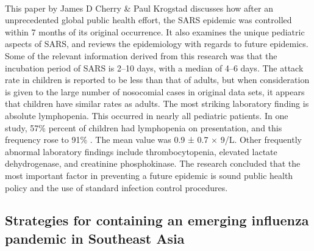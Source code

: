 \documentclass[14pt, a4paper]{extarticle}
\begin{document}
	       \paragraph{} This paper by James D Cherry \& Paul Krogstad discusses how after an unprecedented global public health effort, the SARS epidemic was controlled within 7 months of its original occurrence. It also examines the unique pediatric aspects of SARS, and reviews the epidemiology with regards to future epidemics. Some of the relevant information derived from this research was that the incubation period of SARS is 2–10 days, with a median of 4–6 days. The attack rate in children is reported to be less than that of adults, but when consideration is given to the large number of nosocomial cases in original data sets, it appears that children have similar rates as adults. The most striking laboratory finding is absolute lymphopenia. This occurred in nearly all pediatric patients. In one study, 57\% percent of children had lymphopenia on presentation, and this frequency rose to 91\% . The mean value was 0.9 ± 0.7 × 9/L. Other frequently abnormal laboratory findings include thrombocytopenia, elevated lactate dehydrogenase, and creatinine phosphokinase. The research concluded that the most important factor in preventing a future epidemic is sound public health policy and the use of standard infection control procedures.
	        
	   \subsection{Strategies for containing an emerging influenza pandemic in Southeast Asia}
\end{document}
